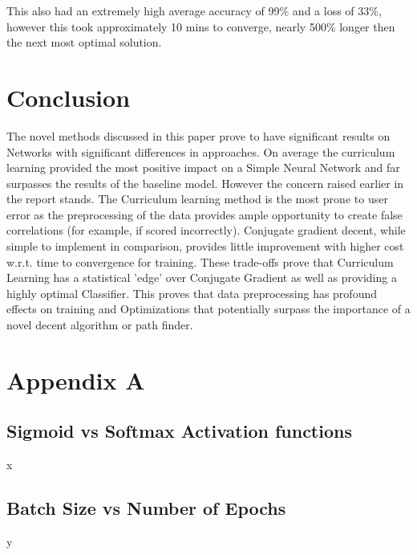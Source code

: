 \documentclass[conference]{IEEEtran}
\begin{document}
This also had an extremely high average accuracy of 99\% and a loss of 33\%, however this took approximately 10 mins to converge, nearly 500\% longer then the next most optimal solution.




\section{Conclusion}

The novel methods discussed in this paper prove to have significant results on Networks with significant differences in approaches.
On average the curriculum learning provided the most positive impact on a Simple Neural Network and far surpasses the results of the baseline model. However the concern raised earlier in the report stands. The Curriculum learning method is the most prone to user error as the preprocessing of the data provides ample opportunity to create false correlations (for example, if scored incorrectly). 
Conjugate gradient decent, while simple to implement in comparison, provides little improvement with higher cost w.r.t. time to convergence for training.
These trade-offs prove that Curriculum Learning has a statistical 'edge' over Conjugate Gradient as well as providing a highly optimal Classifier. This proves that data preprocessing has profound effects on training and Optimizations that potentially surpass the importance of a novel decent algorithm or path finder.

\section{Appendix A}

\subsection{Sigmoid vs Softmax Activation functions}
x
\subsection{Batch Size vs Number of Epochs}
y





\vspace{12pt}
\color{red}
\end{document}

